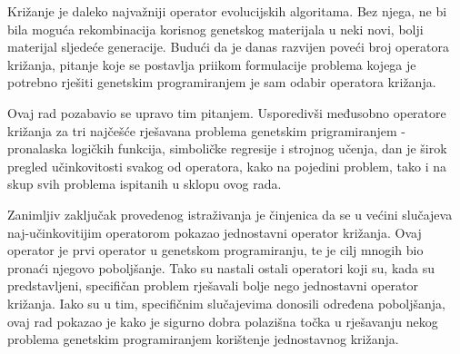 Križanje je daleko najvažniji operator evolucijskih algoritama. Bez njega, ne bi bila moguća rekombinacija korisnog genetskog materijala u neki novi, bolji materijal sljedeće generacije. Budući da je danas razvijen poveći broj operatora križanja, pitanje koje se postavlja priikom formulacije problema kojega je potrebno rješiti genetskim programiranjem je sam odabir operatora križanja. 

Ovaj rad pozabavio se upravo tim pitanjem. Usporedivši međusobno operatore križanja za tri najčešće rješavana problema genetskim prigramiranjem - pronalaska logičkih funkcija, simboličke regresije i strojnog učenja, dan je širok pregled učinkovitosti svakog od operatora, kako na pojedini problem, tako i na skup svih problema ispitanih u sklopu ovog rada. 

Zanimljiv zaključak provedenog istraživanja je činjenica da se u većini slučajeva naj-učinkovitijim operatorom pokazao jednostavni operator križanja. Ovaj operator je prvi operator u genetskom programiranju, te je cilj mnogih bio pronaći njegovo poboljšanje. Tako su nastali ostali operatori koji su, kada su predstavljeni, specifičan problem rješavali bolje nego jednostavni operator križanja. Iako su u tim, specifičnim slučajevima donosili određena poboljšanja, ovaj rad pokazao je kako je sigurno dobra polazišna točka u rješavanju nekog problema genetskim programiranjem korištenje jednostavnog križanja.